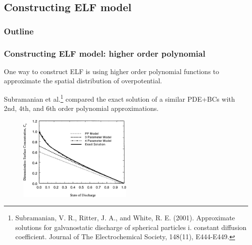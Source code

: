 \documentclass[10pt,xcolor=dvipsnames,compress]{beamer}
\begin{document}
\subsection{Constructing ELF model}
\begin{frame}
\frametitle{Outline}
\vfill

\vspace{0.7in}
\vspace{0.7in}

\vfill
\end{frame}


\begin{frame}
\frametitle{Constructing ELF model: higher order polynomial}
\vfill

One way to construct ELF is using higher order polynomial functions to approximate the spatial distribution of overpotential. 

Subramanian et al.\footnote{Subramanian, V. R., Ritter, J. A., and White, R. E. (2001). Approximate solutions for galvanostatic discharge of spherical particles i. constant diffusion coefficient. Journal of The Electrochemical Society, 148(11), E444-E449.}
compared the exact solution of a similar PDE+BCs with 2nd, 4th, and 6th order polynomial approximations.
\begin{figure}
    \includegraphics[trim = 0.in 0.in 0.in 0.in, clip, width=0.5\textwidth]{figs/sub.png} 
\end{figure}



\vfill
\end{frame}
\end{document}
